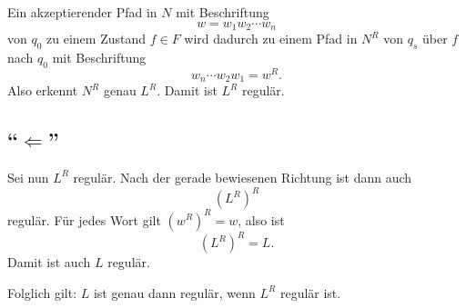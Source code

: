 \documentclass[a4paper,12pt]{article}
\begin{document}
Ein akzeptierender Pfad in $N$ mit Beschriftung
\[
w=w_1w_2\cdots w_n
\]
von $q_0$ zu einem Zustand $f\in F$ wird dadurch zu einem Pfad in $N^R$ von $q_s$ über $f$ nach $q_0$ mit Beschriftung
\[
w_n\cdots w_2w_1=w^R.
\]
Also erkennt $N^R$ genau $L^R$. Damit ist $L^R$ regulär.

\subsection*{``$\Leftarrow$''}

Sei nun $L^R$ regulär. Nach der gerade bewiesenen Richtung ist dann auch
\[
(L^R)^R
\]
regulär. Für jedes Wort gilt $(w^R)^R=w$, also ist
\[
(L^R)^R=L.
\]
Damit ist auch $L$ regulär.

\medskip
Folglich gilt: $L$ ist genau dann regulär, wenn $L^R$ regulär ist.
\end{document}
